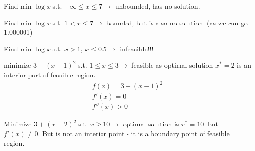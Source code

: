 \begin{example-N}
	Find min $\log x$ s.t. $-\infty \leq x \leq 7 \rightarrow$ unbounded, has no solution.
\end{example-N}
\begin{example-N}
	Find min $\log x$ s.t. $1 < x \leq 7 \rightarrow$ bounded, but is also no solution. (as we can go 1.000001)
\end{example-N}
\begin{example-N}
	Find min $\log x$ s.t. $x > 1$, $x \leq 0.5 \rightarrow$ infeasible!!!
\end{example-N}
\begin{example-N}
	minimize $3 + (x-1)^2$ s.t. $1 \leq x \leq 3 \rightarrow$ feasible as optimal solution $x^* = 2$ is an interior part of feasible region.
	\begin{gather*}
		f(x) = 3 + (x-1)^2\\
		f'(x) = 0\\
		f''(x) > 0
	\end{gather*} 
\end{example-N}
\begin{example-N}
	Minimize $3 + (x-2)^2$ s.t. $x \geq 10 \rightarrow$ optimal solution is $x^* = 10$. but $f'(x) \neq 0$. But is not an interior point - it is a boundary point of feasible region.\\
\end{example-N}